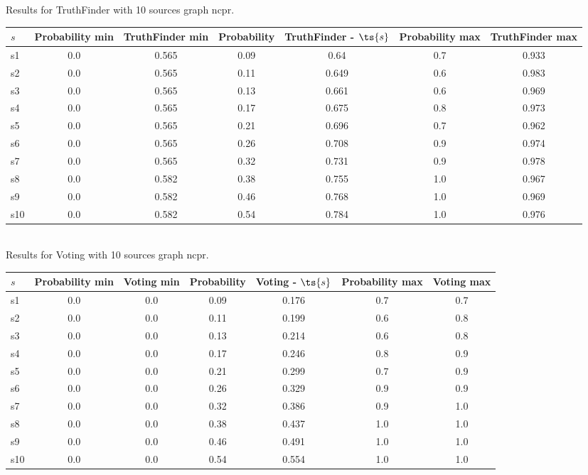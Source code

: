 \documentclass{article}
\begin{document}
\noindent Results for TruthFinder with 10 sources graph ncpr.

\noindent\begin{tabular}{|l|c|c|c|c|c|c|}
\hline
$s$& Probability min & TruthFinder min & Probability & TruthFinder - $\ts{s}$ & Probability max & TruthFinder max\\
\hline
s1 &0.0 & 0.565 & 0.09 & 0.64 & 0.7 & 0.933\\
\hline
s2 &0.0 & 0.565 & 0.11 & 0.649 & 0.6 & 0.983\\
\hline
s3 &0.0 & 0.565 & 0.13 & 0.661 & 0.6 & 0.969\\
\hline
s4 &0.0 & 0.565 & 0.17 & 0.675 & 0.8 & 0.973\\
\hline
s5 &0.0 & 0.565 & 0.21 & 0.696 & 0.7 & 0.962\\
\hline
s6 &0.0 & 0.565 & 0.26 & 0.708 & 0.9 & 0.974\\
\hline
s7 &0.0 & 0.565 & 0.32 & 0.731 & 0.9 & 0.978\\
\hline
s8 &0.0 & 0.582 & 0.38 & 0.755 & 1.0 & 0.967\\
\hline
s9 &0.0 & 0.582 & 0.46 & 0.768 & 1.0 & 0.969\\
\hline
s10 &0.0 & 0.582 & 0.54 & 0.784 & 1.0 & 0.976\\
\hline
\end{tabular}\\

\noindent Results for Voting with 10 sources graph ncpr.

\noindent\begin{tabular}{|l|c|c|c|c|c|c|}
\hline
$s$& Probability min & Voting min & Probability & Voting - $\ts{s}$ & Probability max & Voting max\\
\hline
s1 &0.0 & 0.0 & 0.09 & 0.176 & 0.7 & 0.7\\
\hline
s2 &0.0 & 0.0 & 0.11 & 0.199 & 0.6 & 0.8\\
\hline
s3 &0.0 & 0.0 & 0.13 & 0.214 & 0.6 & 0.8\\
\hline
s4 &0.0 & 0.0 & 0.17 & 0.246 & 0.8 & 0.9\\
\hline
s5 &0.0 & 0.0 & 0.21 & 0.299 & 0.7 & 0.9\\
\hline
s6 &0.0 & 0.0 & 0.26 & 0.329 & 0.9 & 0.9\\
\hline
s7 &0.0 & 0.0 & 0.32 & 0.386 & 0.9 & 1.0\\
\hline
s8 &0.0 & 0.0 & 0.38 & 0.437 & 1.0 & 1.0\\
\hline
s9 &0.0 & 0.0 & 0.46 & 0.491 & 1.0 & 1.0\\
\hline
s10 &0.0 & 0.0 & 0.54 & 0.554 & 1.0 & 1.0\\
\hline
\end{tabular}\\
\end{document}
